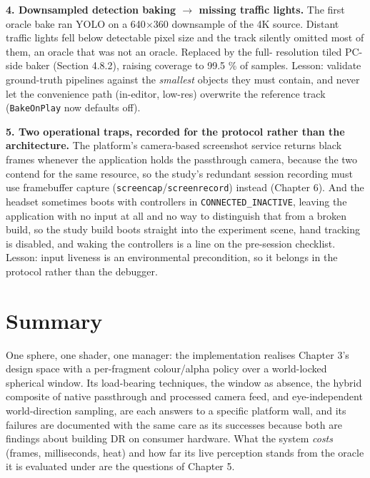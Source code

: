 \textbf{4. Downsampled detection baking $\rightarrow$ missing traffic lights.} The first oracle bake ran YOLO on a
640$\times$360 downsample of the 4K source. Distant traffic lights fell below detectable pixel size and the
track silently omitted most of them, an oracle that was not an oracle. Replaced by the full-
resolution tiled PC-side baker (Section 4.8.2), raising coverage to 99.5 \% of samples. Lesson:
validate ground-truth pipelines against the \textit{smallest} objects they must contain, and never let the
convenience path (in-editor, low-res) overwrite the reference track (\verb|BakeOnPlay| now defaults off).

\textbf{5. Two operational traps, recorded for the protocol rather than the architecture.} The platform's camera-based screenshot service returns black frames whenever the application holds the passthrough camera, because the two contend for the same resource, so the study's redundant session recording must use framebuffer capture (\verb|screencap|/\verb|screenrecord|) instead (Chapter 6). And the headset sometimes boots with controllers in \verb|CONNECTED_INACTIVE|, leaving the application with no input at all and no way to distinguish that from a broken build, so the study build boots straight into the experiment scene, hand tracking is disabled, and waking the controllers is a line on the pre-session checklist. Lesson: input liveness is an environmental precondition, so it belongs in the protocol rather than the debugger.

\section{Summary}

One sphere, one shader, one manager: the implementation realises Chapter 3's design space with a
per-fragment colour/alpha policy over a world-locked spherical window. Its load-bearing techniques,
the window as absence, the hybrid composite of native passthrough and processed camera feed, and
eye-independent world-direction sampling, are each answers to a specific platform wall, and its
failures are documented with the same care as its successes because both are findings about building
DR on consumer hardware. What the system \textit{costs} (frames, milliseconds, heat) and how far its live
perception stands from the oracle it is evaluated under are the questions of Chapter 5.
